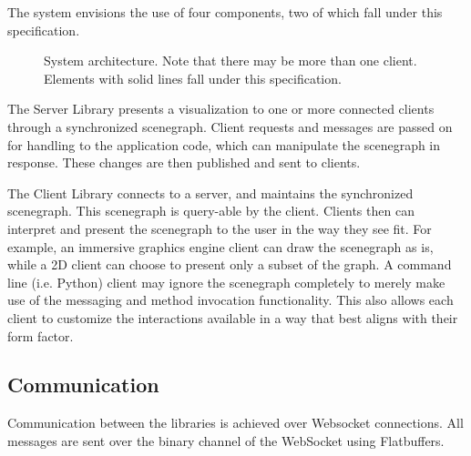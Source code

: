 \documentclass[11pt, oneside]{amsart}
\begin{document}
The system envisions the use of four components, two of which fall under this specification.

\begin{figure}[htbp]
\begin{center}


\caption{System architecture. Note that there may be more than one client. Elements with solid lines fall under this specification.}
\end{center}
\end{figure}

The Server Library presents a visualization to one or more connected clients through a synchronized scenegraph. Client requests and messages are passed on for handling to the application code, which can manipulate the scenegraph in response. These changes are then published and sent to clients.

The Client Library connects to a server, and maintains the synchronized scenegraph. This scenegraph is query-able by the client. Clients then can interpret and present the scenegraph to the user in the way they see fit. For example, an immersive graphics engine client can draw the scenegraph as is, while a 2D client can choose to present only a subset of the graph. A command line (i.e. Python) client may ignore the scenegraph completely to merely make use of the messaging and method invocation functionality. This also allows each client to customize the interactions available in a way that best aligns with their form factor.

\subsection{Communication}

Communication between the libraries is achieved over Websocket connections. All messages are sent over the binary channel of the WebSocket using Flatbuffers.
\end{document}
